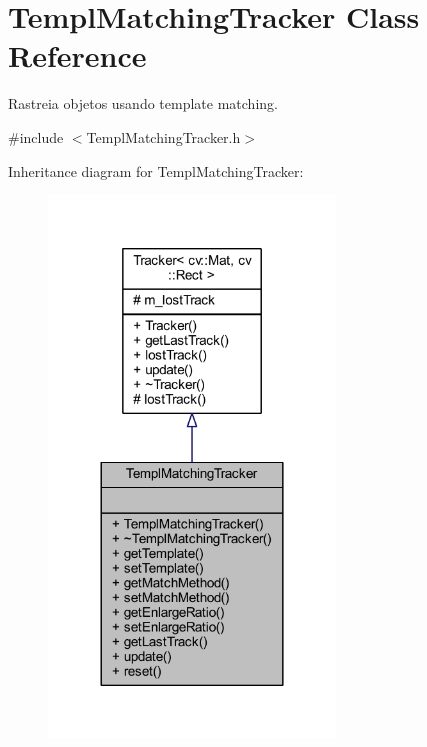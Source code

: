 \hypertarget{class_viscv_1_1_templ_matching_tracker}{}\section{Templ\+Matching\+Tracker Class Reference}
\label{class_viscv_1_1_templ_matching_tracker}


Rastreia objetos usando template matching.  




{\ttfamily \#include $<$Templ\+Matching\+Tracker.\+h$>$}



Inheritance diagram for Templ\+Matching\+Tracker\+:
\nopagebreak
\begin{figure}[H]
\begin{center}
\leavevmode
\includegraphics[width=216pt]{class_viscv_1_1_templ_matching_tracker__inherit__graph}
\end{center}
\end{figure}


